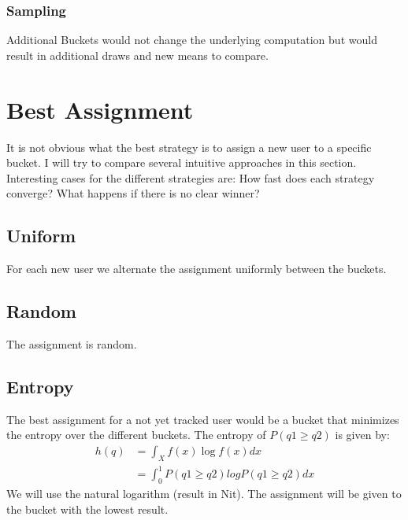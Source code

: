 \documentclass[../Thesis.tex]{subfiles}
\begin{document}
\subsubsection{Sampling}
Additional Buckets would not change the underlying computation but would result in additional draws and new means to compare. 

\section{Best Assignment}
It is not obvious what the best strategy is to assign a new user to a specific bucket. I will try to compare several intuitive approaches in this section. Interesting cases for the different strategies are: How fast does each strategy converge? What happens if there is no clear winner?
\subsection{Uniform}
For each new user we alternate the assignment uniformly between the buckets.
\subsection{Random}
The assignment is random.
\subsection{Entropy}
The best assignment for a not yet tracked user would be a bucket that minimizes the entropy over the different buckets. The entropy of $P(q1\geq q2)$ is given by:
\begin{align*}
h(q) 	&= \int_{X}f(x)\log f(x)dx \\
		&= \int_{0}^{1} P(q1\geq q2)log P(q1\geq q2)dx
\end{align*}
We will use the natural logarithm (result in Nit). The assignment will be given to the bucket with the lowest result.
\end{document}
